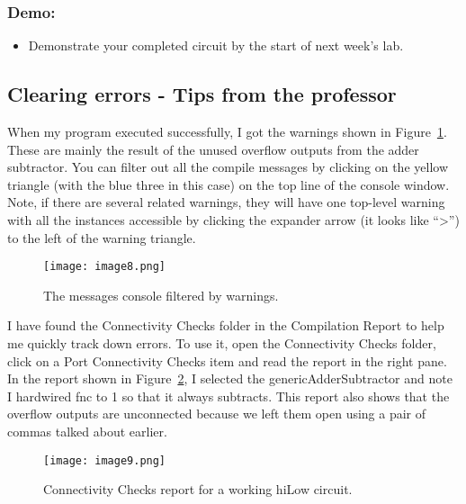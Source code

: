 \subsubsection{Demo:}
\begin{itemize}
\item Demonstrate your completed circuit by the start of next week's lab.
\end{itemize}

\subsection{Clearing errors - Tips from the professor}

When my program executed successfully, I got the warnings shown in
Figure~\ref{fig:messageConsole}. These are mainly the result of the unused overflow outputs
from the adder subtractor. You can filter out all the compile messages
by clicking on the yellow triangle (with the blue three in this case) on
the top line of the console window. Note, if there are several related
warnings, they will have one top-level warning with all the instances
accessible by clicking the expander arrow (it looks like
``\textgreater'') to the left of the warning triangle.

\begin{figure}
\texttt{[image: image8.png]}
\caption{The messages console filtered by warnings.}
\label{fig:messageConsole}
\end{figure}

I have found the Connectivity Checks folder in the Compilation Report to
help me quickly track down errors. To use it, open the Connectivity
Checks folder, click on a Port Connectivity Checks item and read the
report in the right pane. In the report shown in Figure~\ref{fig:connectivityCheck}, I selected
the genericAdderSubtractor and note I hardwired fnc to 1 so that it
always subtracts. This report also shows that the overflow outputs are
unconnected because we left them open using a pair of commas talked
about earlier.

\begin{figure}
\texttt{[image:  image9.png]}
\caption{Connectivity Checks report for a working hiLow circuit.}
\label{fig:connectivityCheck}
\end{figure}

